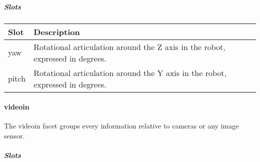 \documentclass[a4paper]{article}
\begin{document}
\subparagraph{Slots}

\begin{flushleft}
\tablehead{}
\begin{supertabular}{|m{3.293cm}|m{11.997cm}|}
\hline
\sffamily\bfseries Slot &
\sffamily\bfseries Description\\\hline
yaw &
\sffamily Rotational articulation around the Z
axis in the robot, expressed in degrees.\\\hline
pitch &
\sffamily Rotational articulation around the Y
axis in the robot, expressed in degrees.\\\hline
\end{supertabular}
\end{flushleft}
\paragraph{videoin}


The videoin facet groups every information relative to cameras or any
image sensor.

\subparagraph{Slots}
\end{document}
